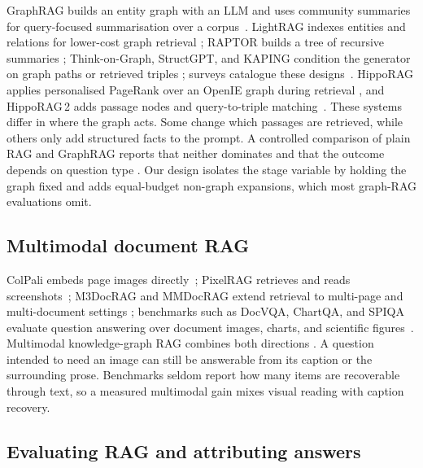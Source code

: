 \documentclass[preprint,12pt]{elsarticle}
\begin{document}
GraphRAG builds an entity graph with an LLM and uses community summaries for
query-focused summarisation over a corpus~\cite{edge2024graphrag}. LightRAG
indexes entities and relations for lower-cost graph retrieval
\cite{guo2024lightrag}; RAPTOR builds a tree of recursive summaries
\cite{sarthi2024raptor}; Think-on-Graph, StructGPT, and KAPING condition the
generator on graph paths or retrieved triples
\cite{sun2024thinkongraph,jiang2023structgpt,baek2023kaping}; surveys
catalogue these designs~\cite{peng2024graphragsurvey}. HippoRAG applies
personalised PageRank over an OpenIE graph during retrieval
\cite{hipporag}, and HippoRAG\,2 adds passage nodes and query-to-triple
matching~\cite{gutierrez2025hipporag2}. These systems differ in where the graph
acts. Some change which passages are retrieved, while others only add
structured facts to the prompt. A controlled comparison of plain RAG and GraphRAG reports
that neither dominates and that the outcome depends on question type
\cite{ragvsgraphrag}. Our design isolates the stage variable by holding the
graph fixed and adds equal-budget non-graph expansions, which most graph-RAG
evaluations omit.

\subsection{Multimodal document RAG}

ColPali embeds page images directly~\cite{faysse2024colpali}; PixelRAG
retrieves and reads screenshots~\cite{wang2025pixelrag}; M3DocRAG and MMDocRAG
extend retrieval to multi-page and multi-document settings
\cite{cho2024m3docrag,dong2025mmdocrag}; benchmarks such as DocVQA, ChartQA,
and SPIQA evaluate question answering over document images, charts, and
scientific figures~\cite{mathew2021docvqa,masry2022chartqa,spiqa}. Multimodal
knowledge-graph RAG combines both directions
\cite{wang2026mkgragbench,wang2026multimodalgraphrag}. A question intended to
need an image can still be answerable from its caption or the surrounding
prose. Benchmarks seldom report how many items are recoverable through text,
so a measured multimodal gain mixes visual reading with caption recovery.

\subsection{Evaluating RAG and attributing answers}
\end{document}
